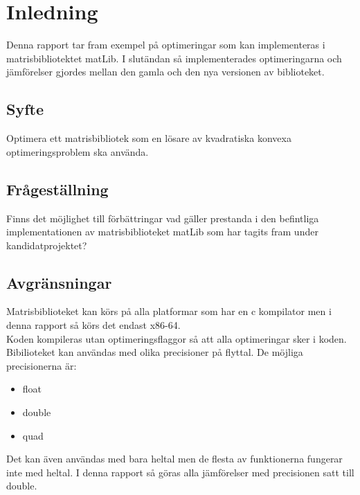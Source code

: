 \section{Inledning}
	Denna rapport tar fram exempel på optimeringar som kan implementeras i matrisbibliotektet matLib. I slutändan så implementerades optimeringarna och jämförelser gjordes mellan den gamla och den nya versionen av biblioteket. 
	\subsection{Syfte}
	Optimera ett matrisbibliotek som en lösare av kvadratiska konvexa optimeringsproblem ska använda. 
	\subsection{Frågeställning}
	Finns det möjlighet till förbättringar vad gäller prestanda i den befintliga implementationen av matrisbiblioteket matLib som har tagits fram under kandidatprojektet?
	\subsection{Avgränsningar}
	Matrisbiblioteket kan körs på alla platformar som har en c kompilator men i denna rapport så körs det endast x86-64. 
	\\
	Koden kompileras utan optimeringsflaggor så att alla optimeringar sker i koden. 
	\\
	Bibilioteket kan användas med olika precisioner på flyttal. De möjliga precisionerna är:
	\begin{itemize}
	\item float
	\item double
	\item quad
	\end{itemize}
	Det kan även användas med bara heltal men de flesta av funktionerna fungerar inte med heltal. I denna rapport så göras alla jämförelser med precisionen satt till double. 